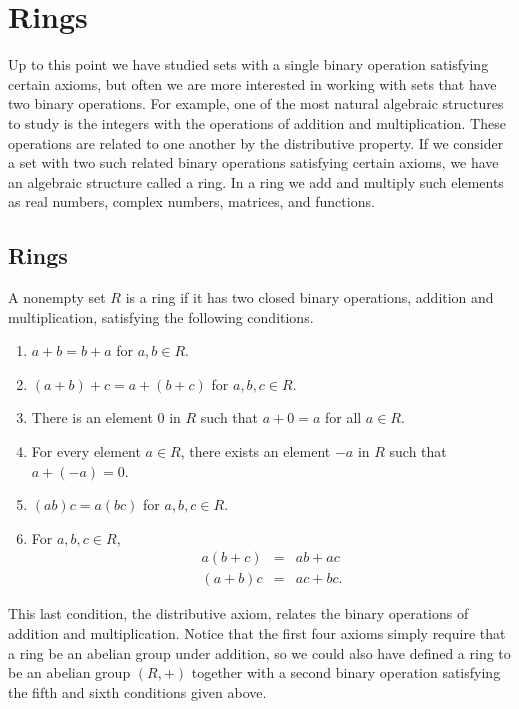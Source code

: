 \chapter{Rings}\label{rings}
 
 
 
Up to this point we have studied sets with a single binary operation
satisfying certain axioms, but often we are more interested in working
with sets that have two binary operations.  For example, one of the
most natural algebraic structures to study is the integers 
with the operations of addition and multiplication. These operations
are related to one another by the distributive
property. If we consider a set with two such related binary operations
satisfying certain axioms, we have an algebraic structure called a
ring. In a ring we add and multiply such elements as real numbers,
complex numbers, matrices, and functions. 
 
 
 
\section{Rings}
 
 
A nonempty set $R$ is a {\bfi ring\/} if
it has two closed binary operations, addition and multiplication,
satisfying the following conditions.  
\begin{enumerate}
 
\item
$a + b = b + a$ for $a, b \in R$.
 
\item
$(a + b) + c = a + ( b + c)$ for $a, b, c  \in R$.
 
\item
There is an element $0$ in $R$ such that $a + 0 = a$ for all $a \in
R$. 
 
\item
For every element $a \in R$, there exists an element $-a$ in $R$ such
that $a + (-a) = 0$. 
 
\item
$(ab)  c = a  ( b  c)$ for $a, b, c  \in R$.
 
\item
For $a, b, c \in R$,
\begin{eqnarray*}
a( b + c)&  = & ab +ac \\
(a + b)c & = & ac + bc.
\end{eqnarray*}
 
\end{enumerate}
This last condition, the distributive axiom, relates the binary
operations of addition and multiplication. Notice that the first four
axioms simply require that a ring be an abelian group under addition,
so we could also have defined a ring to be an abelian group
$(R, +)$ together with a second binary operation satisfying the fifth
and sixth conditions given above.  
 

